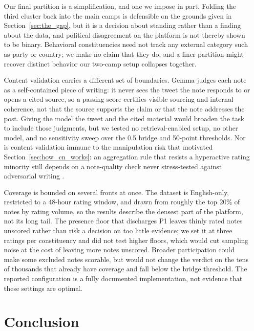 \documentclass[10pt,twocolumn]{article}
\begin{document}
Our final partition is a simplification, and one we impose in part. Folding the
third cluster back into the main camps is defensible on the grounds given in
Section~\ref{sec:the_gap}, but it is a decision about standing rather than a
finding about the data, and political disagreement on the platform is not
thereby shown to be binary.
Behavioral constituencies need not track any external category such as party or
country; we make no claim that they do, and a finer partition might recover
distinct behavior our two-camp setup collapses together.

Content validation carries a different set of boundaries. Gemma judges each
note as a self-contained piece of writing: it never sees the tweet the note
responds to or opens a cited source, so a passing score certifies visible
sourcing and internal coherence, not that the source supports the claim or that
the note addresses the post. Giving the model the tweet and the cited material
would broaden the task to include those judgments, but we tested no
retrieval-enabled setup, no other model, and no sensitivity sweep over the 0.5
bridge and 50-point thresholds. Nor is content validation immune to the
manipulation risk that motivated Section~\ref{sec:how_cn_works}: an aggregation
rule that resists a hyperactive rating minority still depends on a note-quality
check never stress-tested against adversarial writing
\citep{truong2025vulnerable}.

Coverage is bounded on several fronts at once. The dataset is English-only,
restricted to a 48-hour rating window, and drawn from roughly the top 20\% of
notes by rating volume, so the results describe the densest part of the
platform, not its long tail. The presence floor that discharges P1 leaves thinly
rated notes unscored rather than risk a decision on too little evidence; we set
it at three ratings per constituency and did not test higher floors, which would
cut sampling noise at the cost of leaving more notes unscored. Broader
participation could make some excluded notes scorable, but would not change the
verdict on the tens of thousands that already have coverage and fall below the
bridge threshold. The reported configuration is a fully documented
implementation, not evidence that these settings are optimal.

\section{Conclusion}
\end{document}
